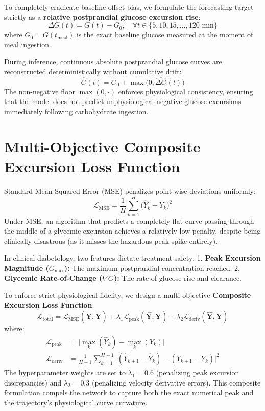 To completely eradicate baseline offset bias, we formulate the forecasting target strictly as a \textbf{relative postprandial glucose excursion rise}:
\begin{equation}
    \Delta G(t) = G(t) - G_0, \quad \forall t \in \{5, 10, 15, \dots, 120\text{ min}\}
\end{equation}
where $G_0 = G(t_{\text{meal}})$ is the exact baseline glucose measured at the moment of meal ingestion.

During inference, continuous absolute postprandial glucose curves are reconstructed deterministically without cumulative drift:
\begin{equation}
    \hat{G}(t) = G_0 + \max\Big(0, \hat{\Delta G}(t)\Big)
\end{equation}
The non-negative floor $\max(0, \cdot)$ enforces physiological consistency, ensuring that the model does not predict unphysiological negative glucose excursions immediately following carbohydrate ingestion.

\section{Multi-Objective Composite Excursion Loss Function}
Standard Mean Squared Error (MSE) penalizes point-wise deviations uniformly:
\begin{equation}
    \mathcal{L}_{\text{MSE}} = \frac{1}{H} \sum_{k=1}^{H} \big(\hat{Y}_k - Y_k\big)^2
\end{equation}
Under MSE, an algorithm that predicts a completely flat curve passing through the middle of a glycemic excursion achieves a relatively low penalty, despite being clinically disastrous (as it misses the hazardous peak spike entirely).

In clinical diabetology, two features dictate treatment safety:
1. \textbf{Peak Excursion Magnitude ($G_{\max}$):} The maximum postprandial concentration reached.
2. \textbf{Glycemic Rate-of-Change ($\nabla G$):} The rate of glucose rise and clearance.

To enforce strict physiological fidelity, we design a multi-objective \textbf{Composite Excursion Loss Function}:
\begin{equation}
    \mathcal{L}_{\text{total}} = \mathcal{L}_{\text{MSE}}(\hat{\mathbf{Y}}, \mathbf{Y}) + \lambda_1 \mathcal{L}_{\text{peak}}(\hat{\mathbf{Y}}, \mathbf{Y}) + \lambda_2 \mathcal{L}_{\text{deriv}}(\hat{\mathbf{Y}}, \mathbf{Y})
\end{equation}
where:
\begin{align}
    \mathcal{L}_{\text{peak}} &= \Big| \max_{k}(\hat{Y}_k) - \max_{k}(Y_k) \Big| \\
    \mathcal{L}_{\text{deriv}} &= \frac{1}{H-1} \sum_{k=1}^{H-1} \Big| (\hat{Y}_{k+1} - \hat{Y}_k) - (Y_{k+1} - Y_k) \Big|^2
\end{align}
The hyperparameter weights are set to $\lambda_1 = 0.6$ (penalizing peak excursion discrepancies) and $\lambda_2 = 0.3$ (penalizing velocity derivative errors). This composite formulation compels the network to capture both the exact numerical peak and the trajectory's physiological curve curvature.

